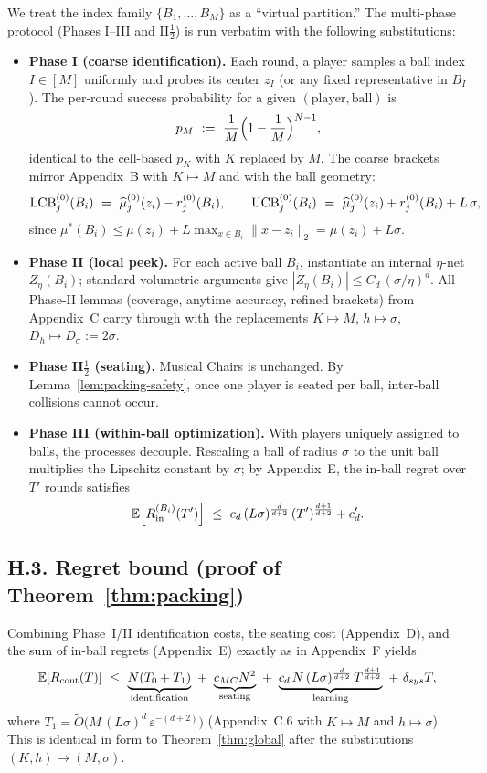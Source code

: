 We treat the index family $\{B_1,\dots,B_M\}$ as a ``virtual partition.” The multi-phase protocol (Phases I–III and II$\tfrac{1}{2}$) is run  {verbatim} with the following substitutions:
\begin{itemize}
\item \textbf{Phase I (coarse identification).} Each round, a player samples a ball index $I\in[M]$ uniformly and probes its center $z_I$ (or any fixed representative in $B_I$). The per-round success probability for a given $(\text{player},\text{ball})$ is
\[
p_M\ :=\ \frac{1}{M}\Bigl(1-\frac{1}{M}\Bigr)^{N-1},
\]
identical to the cell-based $p_K$ with $K$ replaced by $M$. The coarse brackets mirror Appendix~B with $K\mapsto M$ and with the ball geometry:
\[
\LCB^{(0)}_j(B_i)\ =\ \widehat\mu^{(0)}_j(z_i)-r^{(0)}_j(B_i),
\qquad
\UCB^{(0)}_j(B_i)\ =\ \widehat\mu^{(0)}_j(z_i)+r^{(0)}_j(B_i)+L\,\sigma,
\]
since $\mu^\ast(B_i)\le \mu(z_i)+L\max_{x\in B_i}\|x-z_i\|_2=\mu(z_i)+L\sigma$.
\item \textbf{Phase II (local peek).} For each active ball $B_i$, instantiate an internal $\eta$-net $Z_\eta(B_i)$; standard volumetric arguments give $|Z_\eta(B_i)|\le C_d\,(\sigma/\eta)^d$. All Phase‑II lemmas (coverage, anytime accuracy, refined brackets) from Appendix~C carry through with the replacements $K\mapsto M$, $h\mapsto \sigma$, $D_h\mapsto D_\sigma:=2\sigma$.
\item \textbf{Phase II$\tfrac{1}{2}$ (seating).} Musical Chairs is unchanged. By Lemma~\ref{lem:packing-safety}, once one player is seated per ball, inter-ball collisions cannot occur.
\item \textbf{Phase III (within-ball optimization).} With players uniquely assigned to balls, the processes decouple. Rescaling a ball of radius $\sigma$ to the unit ball multiplies the Lipschitz constant by $\sigma$; by Appendix~E, the in-ball regret over $T'$ rounds satisfies
\[
\EE\!\left[R_{\mathrm{in}}^{(B_i)}(T')\right]\ \le\ c_d\,(L\sigma)^{\frac{d}{d+2}}\,(T')^{\frac{d+1}{d+2}}+c'_d.
\]
\end{itemize}

\subsection*{H.3.\; Regret bound (proof of Theorem~\ref{thm:packing})}

Combining Phase~I/II identification costs, the seating cost (Appendix~D), and the sum of in-ball regrets (Appendix~E) exactly as in Appendix~F yields
\[
\EE[R_{\cont}(T)]
\ \le\
\underbrace{N(T_0+T_1)}_{\text{identification}}
\ +\ 
\underbrace{c_{MC}N^2}_{\text{seating}}
\ +\
\underbrace{c_d\,N\,(L\sigma)^{\frac{d}{d+2}}\,T^{\frac{d+1}{d+2}}}_{\text{learning}}
\ +\ \delta_{sys}T,
\]
where $T_1=\tilde O\!\big(M\,(L\sigma)^d\,\varepsilon^{-(d+2)}\big)$ (Appendix~C.6 with $K\mapsto M$ and $h\mapsto \sigma$). This is identical in form to Theorem~\ref{thm:global} after the substitutions $(K,h)\mapsto (M,\sigma)$.

